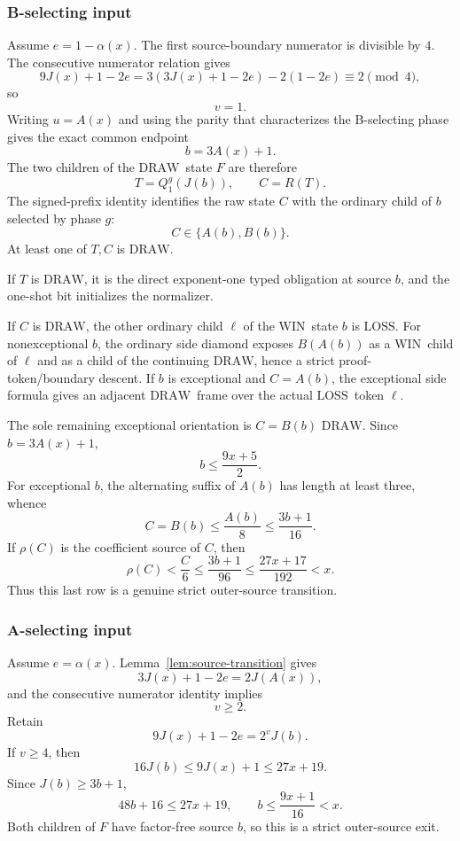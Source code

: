 \documentclass[11pt]{article}
\newcommand{\WIN}{\ensuremath{\mathrm{WIN}}}
\newcommand{\LOSS}{\ensuremath{\mathrm{LOSS}}}
\newcommand{\DRAW}{\ensuremath{\mathrm{DRAW}}}
\begin{document}
\subsubsection{B-selecting input}

Assume $e=1-\alpha(x)$. The first source-boundary numerator is divisible by
$4$. The consecutive numerator relation gives
\[
 9J(x)+1-2e
 =3(3J(x)+1-2e)-2(1-2e)
 \equiv2\pmod4,
\]
so
\[
 \boxed{v=1.}
\]
Writing $u=A(x)$ and using the parity that characterizes the B-selecting
phase gives the exact common endpoint
\[
 \boxed{b=3A(x)+1.}
\]
The two children of the \DRAW\ state $F$ are therefore
\[
 T=Q_1^g(J(b)),\qquad C=R(T).
\]
The signed-prefix identity identifies the raw state $C$ with the ordinary
child of $b$ selected by phase $g$:
\[
 \boxed{C\in\{A(b),B(b)\}.}
\]
At least one of $T,C$ is \DRAW.

If $T$ is \DRAW, it is the direct exponent-one typed obligation at source
$b$, and the one-shot bit initializes the normalizer.

If $C$ is \DRAW, the other ordinary child $\ell$ of the \WIN\ state $b$ is
\LOSS. For nonexceptional $b$, the ordinary side diamond exposes
$B(A(b))$ as a \WIN\ child of $\ell$ and as a child of the continuing
\DRAW, hence a strict proof-token/boundary descent. If $b$ is exceptional
and $C=A(b)$, the exceptional side formula gives an adjacent \DRAW\ frame over
the actual \LOSS\ token $\ell$.

The sole remaining exceptional orientation is $C=B(b)$ \DRAW. Since
$b=3A(x)+1$,
\[
 b\le\frac{9x+5}{2}.
\]
For exceptional $b$, the alternating suffix of $A(b)$ has length at least
three, whence
\[
 C=B(b)\le\frac{A(b)}8\le\frac{3b+1}{16}.
\]
If $\rho(C)$ is the coefficient source of $C$, then
\[
 \rho(C)<\frac C6
 \le\frac{3b+1}{96}
 \le\frac{27x+17}{192}<x.
\]
Thus this last row is a genuine strict outer-source transition.

\subsubsection{A-selecting input}

Assume $e=\alpha(x)$. Lemma~\ref{lem:source-transition} gives
\[
 3J(x)+1-2e=2J(A(x)),
\]
and the consecutive numerator identity implies
\[
 \boxed{v\ge2.}
\]
Retain
\[
 9J(x)+1-2e=2^vJ(b).
\]
If $v\ge4$, then
\[
 16J(b)\le9J(x)+1\le27x+19.
\]
Since $J(b)\ge3b+1$,
\[
 48b+16\le27x+19,
 \qquad
 \boxed{b\le\frac{9x+1}{16}<x.}
\]
Both children of $F$ have factor-free source $b$, so this is a strict
outer-source exit.
\end{document}

